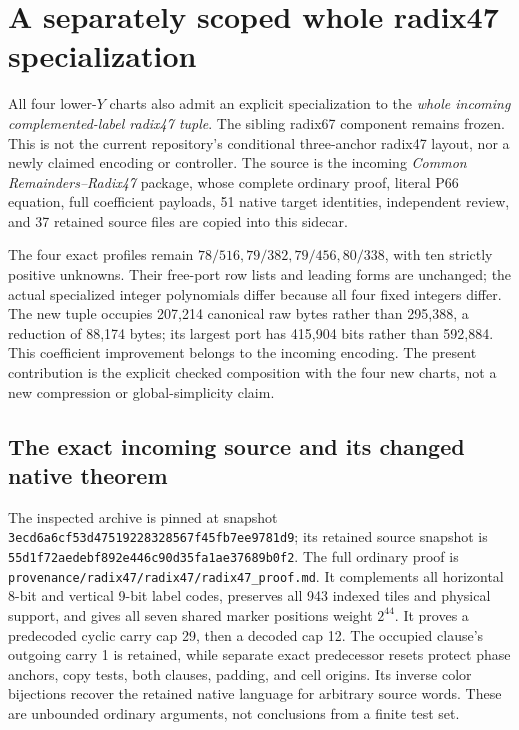 \section{A separately scoped whole radix47 specialization}
\label{sec:compact47}
All four lower-$Y$ charts also admit an explicit specialization to the
\emph{whole incoming complemented-label radix47 tuple}. The sibling radix67
component remains frozen. This is not the current repository's conditional
three-anchor radix47 layout, nor a newly claimed encoding or controller.
The source is the incoming \emph{Common Remainders--Radix47} package, whose
complete ordinary proof, literal P66 equation, full coefficient payloads,
51 native target identities, independent review, and 37 retained source
files are copied into this sidecar.

The four exact profiles remain $78/516,79/382,79/456,80/338$, with ten strictly
positive unknowns. Their free-port row lists and leading forms are unchanged;
the actual specialized integer polynomials differ because all four fixed
integers differ. The new tuple occupies 207,214 canonical raw bytes rather
than 295,388, a reduction of 88,174 bytes; its largest port has 415,904 bits
rather than 592,884. This coefficient improvement belongs to the incoming
encoding. The present contribution is the explicit checked composition with
the four new charts, not a new compression or global-simplicity claim.

\subsection{The exact incoming source and its changed native theorem}
The inspected archive is pinned at snapshot
\texttt{3ecd6a6cf53d47519228328567f45fb7ee9781d9}; its retained source snapshot
is \texttt{55d1f72aedebf892e446c90d35fa1ae37689b0f2}.
The full ordinary proof is
\texttt{provenance/radix47/radix47/radix47\_proof.md}.
It complements all horizontal 8-bit and vertical 9-bit label codes, preserves
all 943 indexed tiles and physical support, and gives all seven shared marker
positions weight $2^{44}$. It proves a predecoded cyclic carry cap 29, then a
decoded cap 12. The occupied clause's outgoing carry 1 is retained, while
separate exact predecessor resets protect phase anchors, copy tests, both
clauses, padding, and cell origins. Its inverse color bijections recover the
retained native language for arbitrary source words. These are unbounded
ordinary arguments, not conclusions from a finite test set.

